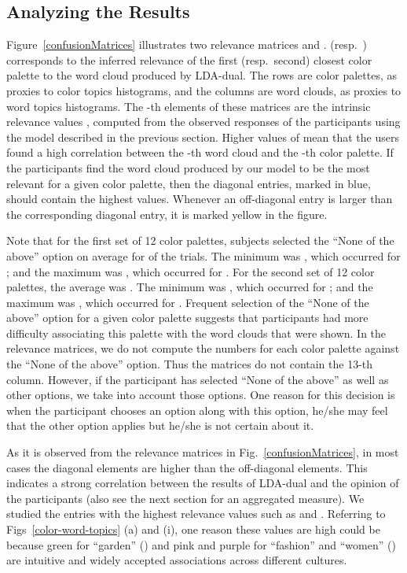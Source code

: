 \documentclass[prodmode,acmtochi]{acmsmall}
\begin{document}
\subsection{Analyzing the Results}

Figure~\ref{confusionMatrices} illustrates two relevance matrices
 and .  (resp.\ ) corresponds to the
inferred relevance of the first (resp.\ second) closest color palette to
the word cloud produced by LDA-dual. The rows are color palettes, as
proxies to color topics histograms, and the columns are word clouds, as
proxies to word topics histograms.  The -th elements of these
matrices are the intrinsic relevance values , computed
from the observed responses of the participants using the model
described in the previous section. Higher values of  mean that the users
found a high correlation between the -th word cloud and the -th
color palette. If the participants find the word cloud produced by our
model to be the most relevant for a given color palette, then the
diagonal entries, marked in blue, should contain the highest values.
Whenever an off-diagonal entry is larger than the corresponding
diagonal entry, it is marked yellow in the figure.

Note that for the first set of 12 color palettes, subjects selected the ``None of the above'' option on average for  of the trials. The minimum was , which occurred for ; and the maximum was , which occurred for . For the second set of 12 color palettes, the average was . The minimum was , which occurred for ; and the maximum was , which occurred for . Frequent selection of the ``None of the above'' option for a given color palette suggests that participants had more difficulty associating this palette with the word clouds that were shown. In the relevance matrices, we do not compute the numbers for each color palette against the ``None of the above'' option. Thus the matrices do not contain the 13-th column.
However, if the participant has selected ``None of the above'' as well as other options, we take into account those options. One reason for this decision is when the participant chooses an option along with this option, he/she may feel that the other option applies but he/she is not certain about it.

As it is observed from the relevance matrices in
Fig.~\ref{confusionMatrices}, in most cases the diagonal elements are
higher than the off-diagonal elements. This indicates a strong
correlation between the results of LDA-dual and the opinion of the
participants (also see the next section for an aggregated measure).  We studied the entries with the highest relevance values
such as  and .  Referring to
Figs~\ref{color-word-topics} (a) and (i), one reason these values are
high could be because green for ``garden'' () and pink and
purple for ``fashion'' and ``women'' () are intuitive and
widely accepted associations across different cultures.
\end{document}
